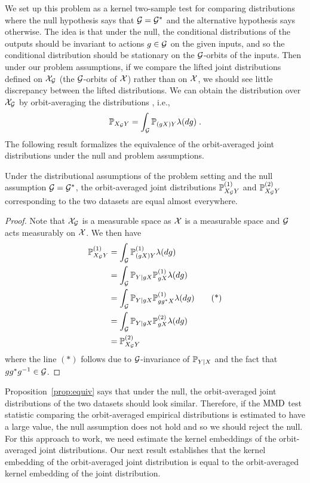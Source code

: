 We set up this problem as a kernel two-sample test for comparing distributions where the null hypothesis says that $\calG=\calG^*$ and the alternative hypothesis says otherwise. The idea is that under the null, the conditional distributions of the outputs should be invariant to actions $g\in\calG$ on the given inputs, and so the conditional distribution should be stationary on the $\calG$-orbits of the inputs. Then under our problem assumptions, if we compare the lifted joint distributions defined on $\calX_\calG$ (the $\calG$-orbits of $\calX$) rather than on $\calX$, we should see little discrepancy between the lifted distributions. We can obtain the distribution over $\calX_\calG$ by orbit-averaging the distributions \parencite{Eaton:2007}, i.e.,
\[
\P_{X_\calG Y} = \int_\calG\P_{(gX)Y}\lambda(dg) \;.
\]
The following result formalizes the equivalence of the orbit-averaged joint distributions under the null and problem assumptions.

\begin{proposition} \label{prop:equiv}
Under the distributional assumptions of the problem setting and the null assumption $\calG=\calG^*$, the orbit-averaged joint distributions $\P_{X_\calG Y}^{(1)}$ and $\P_{X_\calG Y}^{(2)}$ corresponding to the two datasets are equal almost everywhere.
\end{proposition}
\begin{proof}
Note that $\calX_\calG$ is a measurable space as $\calX$ is a measurable space and $\calG$ acts measurably on $\calX$. We then have
\begin{align*}
\P_{X_\calG Y}^{(1)} &= \int_{\calG}\P_{(gX)Y}^{(1)}\lambda(dg) \\
&= \int_{\calG}\P_{Y|gX}\P_{gX}^{(1)}\lambda(dg) \\
&= \int_{\calG}\P_{Y|gX}\P_{gg^*X}^{(1)}\lambda(dg) \tag{*} \\
&= \int_{\calG}\P_{Y|gX}\P_{gX}^{(2)}\lambda(dg) \\
&= \P_{X_\calG Y}^{(2)}
\end{align*}
where the line $(*)$ follows due to $\calG$-invariance of $\P_{Y|X}$ and the fact that $gg^*g^{-1}\in\calG$.
\end{proof}

Proposition~\ref{prop:equiv} says that under the null, the orbit-averaged joint distributions of the two datasets should look similar. Therefore, if the $\MMD$ test statistic comparing the orbit-averaged empirical distributions is estimated to have a large value, the null assumption does not hold and so we should reject the null. For this approach to work, we need estimate the kernel embeddings of the orbit-averaged joint distributions. Our next result establishes that the kernel embedding of the orbit-averaged joint distribution is equal to the orbit-averaged kernel embedding of the joint distribution.

